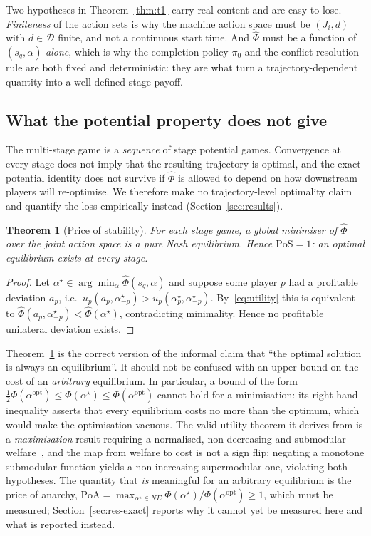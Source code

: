 \documentclass[preprint, 3p, review, 12pt]{elsarticle}
\newtheorem{theorem}{Theorem}
\theoremstyle{definition}
\begin{document}
Two hypotheses in Theorem~\ref{thm:t1} carry real content and are easy to lose.
\emph{Finiteness} of the action sets is why the machine action space must be
$(J_i, d)$ with $d\in\mathcal{D}$ finite, and not a continuous start time. And
$\widehat{\Phi}$ must be a function of $(s_q,\alpha)$ \emph{alone}, which is why the
completion policy $\pi_0$ and the conflict-resolution rule are both fixed and deterministic:
they are what turn a trajectory-dependent quantity into a well-defined stage payoff.

\subsection{What the potential property does not give}
\label{sec:t2}
The multi-stage game is a \emph{sequence} of stage potential games. Convergence at every
stage does not imply that the resulting trajectory is optimal, and the exact-potential
identity does not survive if $\widehat{\Phi}$ is allowed to depend on how downstream players
will re-optimise. We therefore make no trajectory-level optimality claim and quantify the
loss empirically instead (Section~\ref{sec:results}).

\begin{theorem}[Price of stability]
\label{thm:t3}
For each stage game, a global minimiser of $\widehat{\Phi}$ over the joint action space is a
pure Nash equilibrium. Hence $\mathrm{PoS}=1$: an optimal equilibrium exists at every stage.
\end{theorem}

\begin{proof}
Let $\alpha^\star \in \arg\min_\alpha \widehat{\Phi}(s_q,\alpha)$ and suppose some player $p$
had a profitable deviation $a_p$, i.e.\ $u_p(a_p,\alpha^\star_{-p}) >
u_p(\alpha^\star_p,\alpha^\star_{-p})$. By~\eqref{eq:utility} this is equivalent to
$\widehat{\Phi}(a_p,\alpha^\star_{-p}) < \widehat{\Phi}(\alpha^\star)$, contradicting
minimality. Hence no profitable unilateral deviation exists.
\end{proof}

Theorem~\ref{thm:t3} is the correct version of the informal claim that ``the optimal solution
is always an equilibrium''. It should not be confused with an upper bound on the cost of an
\emph{arbitrary} equilibrium. In particular, a bound of the form
$\tfrac12\Phi(\alpha^{\mathrm{opt}}) \le \Phi(\alpha^\star) \le \Phi(\alpha^{\mathrm{opt}})$
cannot hold for a minimisation: its right-hand inequality asserts that every equilibrium
costs no more than the optimum, which would make the optimisation vacuous. The valid-utility
theorem it derives from is a \emph{maximisation} result requiring a normalised, non-decreasing
and submodular welfare~\citep{1181966}, and the map from welfare to cost is not a sign flip:
negating a monotone submodular function yields a non-increasing supermodular one, violating
both hypotheses. The quantity that \emph{is} meaningful for an arbitrary equilibrium is the
price of anarchy, $\mathrm{PoA}=\max_{\alpha^\star\in NE}\Phi(\alpha^\star)/\Phi(\alpha^{\mathrm{opt}})\ge 1$,
which must be measured; Section~\ref{sec:res-exact} reports why it cannot yet be measured
here and what is reported instead.
\end{document}
